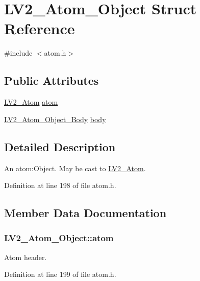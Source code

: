 \hypertarget{struct_l_v2___atom___object}{}\section{L\+V2\+\_\+\+Atom\+\_\+\+Object Struct Reference}
\label{struct_l_v2___atom___object}


{\ttfamily \#include $<$atom.\+h$>$}

\subsection*{Public Attributes}
\begin{DoxyCompactItemize}
\item 
\hyperlink{struct_l_v2___atom}{L\+V2\+\_\+\+Atom} \hyperlink{struct_l_v2___atom___object_a25ffa8b909c12113339500709a5740cc}{atom}
\item 
\hyperlink{struct_l_v2___atom___object___body}{L\+V2\+\_\+\+Atom\+\_\+\+Object\+\_\+\+Body} \hyperlink{struct_l_v2___atom___object_a660e9f36b7bdf33e8d054b5b573d8fdb}{body}
\end{DoxyCompactItemize}


\subsection{Detailed Description}
An atom\+:Object. May be cast to \hyperlink{struct_l_v2___atom}{L\+V2\+\_\+\+Atom}. 

Definition at line 198 of file atom.\+h.



\subsection{Member Data Documentation}
\subsubsection[{\texorpdfstring{atom}{atom}}]{ L\+V2\+\_\+\+Atom\+\_\+\+Object\+::atom}\hypertarget{struct_l_v2___atom___object_a25ffa8b909c12113339500709a5740cc}{}\label{struct_l_v2___atom___object_a25ffa8b909c12113339500709a5740cc}
Atom header. 

Definition at line 199 of file atom.\+h.

